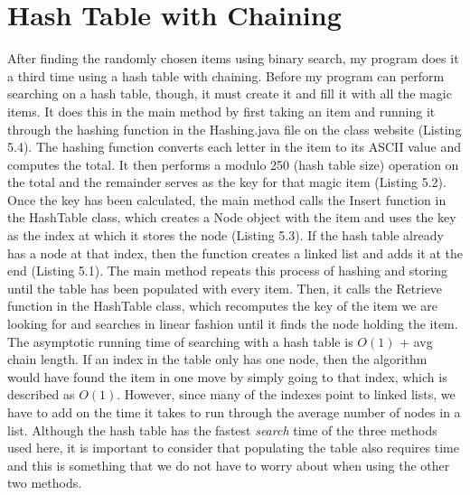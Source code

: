 \documentclass[letterpaper, 10pt,DIV=13]{scrartcl}
\numberwithin{equation}{section} %
\numberwithin{figure}{section} %
\numberwithin{table}{section} %
\begin{document}
\section{Hash Table with Chaining}\label{operations}
After finding the randomly chosen items using binary search, my program does it a third time using a hash table with chaining. Before my program can perform searching on a hash table, though, it must create it and fill it with all the magic items. It does this in the main method by first taking an item and running it through the hashing function in the Hashing.java file on the class website (Listing 5.4). The hashing function converts each letter in the item to its ASCII value and computes the total. It then performs a modulo 250 (hash table size) operation on the total and the remainder serves as the key for that magic item (Listing 5.2). Once the key has been calculated, the main method calls the Insert function in the HashTable class, which creates a Node object with the item and uses the key as the index at which it stores the node (Listing 5.3). If the hash table already has a node at that index, then the function creates a linked list and adds it at the end (Listing 5.1). The main method repeats this process of hashing and storing until the table has been populated with every item. Then, it calls the Retrieve function in the HashTable class, which recomputes the key of the item we are looking for and searches in linear fashion until it finds the node holding the item. The asymptotic running time of searching with a hash table is $O(1)$ + avg chain length. If an index in the table only has one node, then the algorithm would have found the item in one move by simply going to that index, which is described as $O(1)$. However, since many of the indexes point to linked lists, we have to add on the time it takes to run through the average number of nodes in a list. Although the hash table has the fastest \textit{search} time of the three methods used here, it is important to consider that populating the table also requires time and this is something that we do not have to worry about when using the other two methods.
\end{document}
